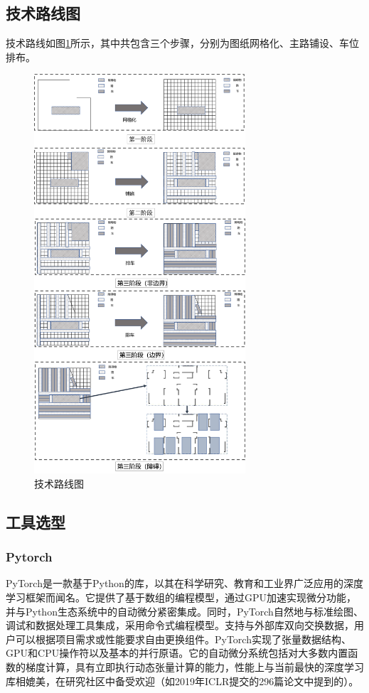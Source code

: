 \subsection{技术路线图}
技术路线如图\ref{fig:tec_road}所示，其中共包含三个步骤，分别为图纸网格化、主路铺设、车位排布。
\begin{figure}[H]
  \centering
  \includegraphics[width=0.7\textwidth]{pictures/技术路线/技术路线_改.png}
  \caption{技术路线图}
  \label{fig:tec_road}
\end{figure}
\subsection{工具选型}
\subsubsection{Pytorch}
PyTorch是一款基于Python的库，以其在科学研究、教育和工业界广泛应用的深度学习框架而闻名。它提供了基于数组的编程模型，通过GPU加速实现微分功能，并与Python生态系统中的自动微分紧密集成。同时，PyTorch自然地与标准绘图、调试和数据处理工具集成，采用命令式编程模型。支持与外部库双向交换数据，用户可以根据项目需求或性能要求自由更换组件。PyTorch实现了张量数据结构、GPU和CPU操作符以及基本的并行原语。它的自动微分系统包括对大多数内置函数的梯度计算，具有立即执行动态张量计算的能力，性能上与当前最快的深度学习库相媲美，在研究社区中备受欢迎（如2019年ICLR提交的296篇论文中提到的\cite{paszke2019pytorch}）。

